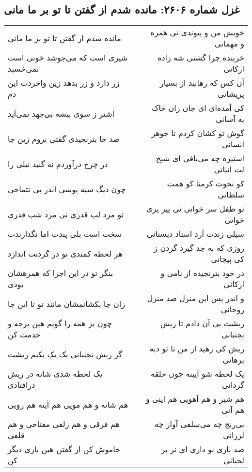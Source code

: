 \begin{center}
\section*{غزل شماره ۲۶۰۶: مانده شدم از گفتن تا تو بر ما مانی}
\label{sec:2606}
\begin{longtable}{l p{0.5cm} r}
مانده شدم از گفتن تا تو بر ما مانی
&&
خویش من و پیوندی نی همره و مهمانی
\\
شیری است که می‌جوشد خونی است نمی‌خسبد
&&
خربنده چرا گشتی شه زاده ارکانی
\\
زر دارد و زر بدهد زین واخردت این دم
&&
آن کس که رهانید از بسیار پریشانی
\\
اشتر ز سوی بیشه بی‌جهد نمی‌آید
&&
کی آمده‌ای ای جان زان خاک به آسانی
\\
صد جا بترنجیدی گفتی نروم زین جا
&&
گوش تو کشان کردم تا جوهر انسانی
\\
در چرخ درآوردم نه گنبد نیلی را
&&
استیزه چه می‌بافی ای شیخ لت انبانی
\\
چون دیگ سیه پوشی اندر پی تتماجی
&&
کو نخوت کرمنا کو همت سلطانی
\\
تو مرد لب قدری نی مرد شب قدری
&&
تو طفل سر خوانی نی پیر پری خوانی
\\
سخت است بلی پندت اما نگذارندت
&&
سیلی زندت آرد استاد دبستانی
\\
هر لحظه کمندی نو در گردنت اندازد
&&
روزی که به جد گیرد گردن ز کی پیچانی
\\
بنگر تو در این اجزا که همرهشان بودی
&&
در خود بترنجیده از نامی و ارکانی
\\
زان جا بکشانمشان مانند تو تا این جا
&&
و اندر پس این منزل صد منزل روحانی
\\
چون بز همه را گویم هین برجه و خدمت کن
&&
ریشت پی آن دادم تا ریش بجنبانی
\\
گر ریش نجنبانی یک یک بکنم ریشت
&&
ریش کی رهید از من تا تو دبه برهانی
\\
یک لحظه شدی شانه در ریش درافتادی
&&
یک لحظه شو آیینه چون حلقه گردانی
\\
هم شانه و هم مویی هم آینه هم رویی
&&
هم شیر و هم آهویی هم اینی و هم آنی
\\
هم فرقی و هم زلفی مفتاحی و هم قلفی
&&
بی‌رنج چه می‌سلفی آواز چه لرزانی
\\
خاموش کن از گفتن هین بازی دیگر کن
&&
صد بازی نو داری ای نر بز لحیانی
\\
\end{longtable}
\end{center}
